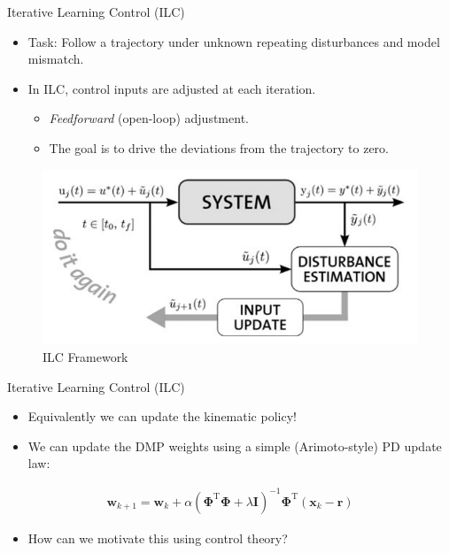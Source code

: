 \documentclass[handout]{beamer}
\newcommand{\basis}{\mathbf{\Phi}} %
\newcommand{\state}{\mathbf{x}} %
\newcommand{\traj}{\mathbf{r}} %
\newcommand{\weights}{\mathbf{w}} %
\begin{document}
%
\begin{frame}{Iterative Learning Control (ILC)}
\begin{itemize}
\item Task: Follow a trajectory under unknown repeating disturbances and model mismatch. \cite{Survey} \pause
\item In ILC, control inputs are adjusted at each iteration. \pause
	\begin{itemize}
	\item \emph{Feedforward} (open-loop) adjustment. \pause
	\item The goal is to drive the deviations from the trajectory to zero. \pause
	\end{itemize}
\end{itemize}
\begin{figure}
\center
\includegraphics[scale=0.25]{ilc_framework}			
\caption{ILC Framework \cite{ILC_Angela}}
\end{figure}
\end{frame}
%
\begin{frame}{Iterative Learning Control (ILC)}
\begin{itemize}
\item Equivalently we can update the kinematic policy! \cite{Survey}
\item We can update the DMP weights using a simple (Arimoto-style) PD update law: 
\end{itemize}
\begin{equation*}
\begin{aligned}
\weights_{k+1} = \weights_{k} + \alpha(\basis^{\mathrm{T}}\basis + \lambda\mathbf{I})^{-1}\basis^{\mathrm{T}}(\state_{k}-\traj)
\end{aligned}
\end{equation*}
\begin{itemize}
\item How can we motivate this using control theory?
\end{itemize}
\end{frame}
\end{document}
